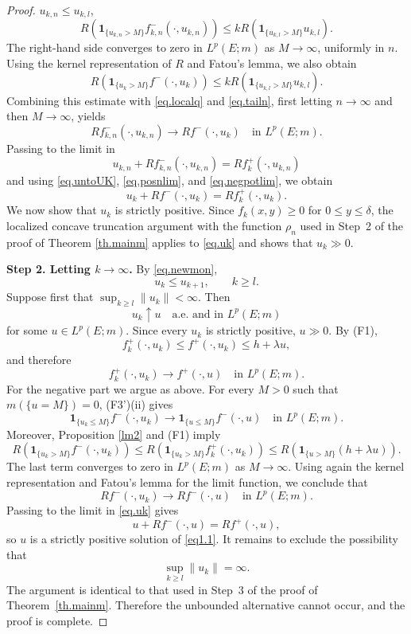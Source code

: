 \documentclass[10pt,a4paper]{amsart}
\begin{document}
\begin{proof}
$u_{k,n}\le u_{k,l}$,
\begin{equation}
\label{eq.tailn}
R\left(
\mathbf1_{\{u_{k,n}>M\}}f_{k,n}^-(\cdot,u_{k,n})
\right)
\le
kR\left(
\mathbf1_{\{u_{k,l}>M\}}u_{k,l}
\right).
\end{equation}
The right-hand side converges to zero in $L^p(E;m)$ as
$M\to\infty$, uniformly in $n$.
Using the kernel representation of $R$ and Fatou's lemma, we also
obtain
\[
R\left(
\mathbf1_{\{u_k>M\}}f^-(\cdot,u_k)
\right)
\le
kR\left(
\mathbf1_{\{u_{k,l}>M\}}u_{k,l}
\right).
\]
Combining this estimate with \eqref{eq.localq} and
\eqref{eq.tailn}, first letting $n\to\infty$ and then
$M\to\infty$, yields
\begin{equation}
\label{eq.negpotlim}
Rf_{k,n}^-(\cdot,u_{k,n})
\longrightarrow
Rf^-(\cdot,u_k)
\quad\text{in }L^p(E;m).
\end{equation}
Passing to the limit in
\[
u_{k,n}+Rf_{k,n}^-(\cdot,u_{k,n})
=
Rf_k^+(\cdot,u_{k,n})
\]
and using \eqref{eq.untoUK}, \eqref{eq.posnlim}, and
\eqref{eq.negpotlim}, we obtain
\begin{equation}
\label{eq.uk}
u_k+Rf^-(\cdot,u_k)=Rf_k^+(\cdot,u_k).
\end{equation}
We now show that $u_k$ is strictly positive. Since
$f_k(x,y)\ge0$ for $0\le y\le\delta$, the localized concave
truncation argument with the function $\rho_n$ used in Step~2 of the proof of
Theorem \ref{th.mainm} 
applies to \eqref{eq.uk} and shows that $u_k\gg0$.


{\bf Step 2. Letting $k\to\infty$.}  By \eqref{eq.newmon},
\[
u_k\le u_{k+1},
\qquad k\ge l.
\]
Suppose first that $\sup_{k\ge l}\|u_k\|<\infty$. Then
\[
u_k\uparrow u
\quad\text{a.e. and in }L^p(E;m)
\]
for some $u\in L^p(E;m)$. Since every $u_k$ is strictly positive,
$u\gg0$. By \textup{(F1)},
\[
f_k^+(\cdot,u_k)\le f^+(\cdot,u_k)\le h+\lambda u,
\]
and therefore
\[
f_k^+(\cdot,u_k)\longrightarrow f^+(\cdot,u)\quad\text{in }L^p(E;m).
\]
For the negative part we argue as above. For every $M>0$ such that
$m(\{u=M\})=0$, \textup{(F3')(ii)} gives
\[
\mathbf1_{\{u_k\le M\}}f^-(\cdot,u_k)\longrightarrow\mathbf1_{\{u\le M\}}f^-(\cdot,u)\quad\text{in }L^p(E;m).
\]
Moreover, Proposition \ref{lm2} and \textup{(F1)} imply
\[
R\left(\mathbf1_{\{u_k>M\}}f^-(\cdot,u_k)\right)\le 
R\left(\mathbf1_{\{u_k>M\}}f_k^+(\cdot,u_k)\right)\le R\left(\mathbf1_{\{u>M\}}(h+\lambda u)\right).
\]
The last term converges to zero in $L^p(E;m)$ as $M\to\infty$.
Using again the kernel representation and Fatou's lemma for the
limit function, we conclude that
\[
Rf^-(\cdot,u_k)\longrightarrow Rf^-(\cdot,u) \quad\text{in }L^p(E;m).
\]
Passing to the limit in \eqref{eq.uk} gives
\[
u+Rf^-(\cdot,u)=Rf^+(\cdot,u),
\]
so $u$ is a strictly positive solution of \eqref{eq1.1}.
It remains to exclude the possibility that
\[
\sup_{k\ge l}\|u_k\|=\infty.
\]
The argument is identical to that used in Step~3 of the proof of
Theorem~\ref{th.mainm}. Therefore the unbounded alternative cannot occur,
and the proof is complete.
\end{proof}
\end{document}
